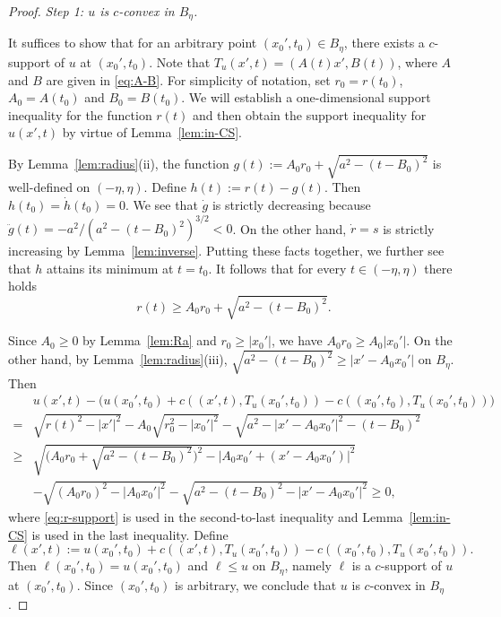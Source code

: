 \documentclass[10pt,a4paper]{amsart}
\begin{document}
\begin{proof}
    {\it Step 1: $u$ is $c$-convex in $B_\eta$.}

    It suffices to show that for an arbitrary point $(x_0',t_0)\in B_\eta$,
    there exists a $c$-support of $u$ at $(x_0',t_0)$.
    Note that $T_u(x',t)=(A(t)x',B(t))$, where $A$ and $B$ are given in \eqref{eq:A-B}.
    For simplicity of notation, set $r_0=r(t_0)$, $A_0=A(t_0)$ and $B_0=B(t_0)$.
    We will establish a one-dimensional support inequality for the function $r(t)$ and then obtain the support inequality for $u(x',t)$ by virtue of Lemma~\ref{lem:in-CS}.

    By Lemma~\ref{lem:radius}(ii), the function $g(t):=A_0r_0+\sqrt{a^2-(t-B_0)^2}$ is well-defined on $(-\eta,\eta)$.
    Define $h(t):=r(t)-g(t)$.
    Then $h(t_0)=\dot{h}(t_0)=0$.
    We see that $\dot{g}$ is strictly decreasing because $\ddot{g}(t)=-a^2/(a^2-(t-B_0)^2)^{3/2}<0$.
    On the other hand, $\dot{r}=s$ is strictly increasing by Lemma~\ref{lem:inverse}.
    Putting these facts together, we further see that $h$ attains its minimum at $t=t_0$.
    It follows that for every $t\in(-\eta,\eta)$ there holds
    \begin{equation}\label{eq:r-support}
        r(t)\geq A_0r_0+\sqrt{a^2-(t-B_0)^2}.
    \end{equation}

    Since $A_0\geq0$ by Lemma~\ref{lem:Ra} and $r_0\geq|x_0'|$, we have $A_0r_0\geq A_0|x_0'|$.
    On the other hand, by Lemma~\ref{lem:radius}(iii), $\sqrt{a^2-(t-B_0)^2}\geq|x'-A_0x_0'|$ on $B_\eta$.
    Then
    \begin{align*}
       &u(x',t)-\Big(u(x_0',t_0)+c((x',t),T_u(x_0',t_0))-c((x_0',t_0),T_u(x_0',t_0))\Big)\\
       =&\sqrt{r(t)^2-|x'|^2}-A_0\sqrt{r_0^2-|x_0'|^2}-\sqrt{a^2-|x'-A_0x_0'|^2-(t-B_0)^2}\\
       \geq&\sqrt{\Big(A_0r_0+\sqrt{a^2-(t-B_0)^2}\Big)^2-|A_0x_0'+(x'-A_0x_0')|^2}\\
       &-\sqrt{(A_0r_0)^2-|A_0x_0'|^2}-\sqrt{a^2-(t-B_0)^2-|x'-A_0x_0'|^2}\geq0,
    \end{align*}
    where \eqref{eq:r-support} is used in the second-to-last inequality and Lemma~\ref{lem:in-CS} is used in the last inequality.
    Define
    \[
    \ell(x',t):=u(x_0',t_0)+c((x',t),T_u(x_0',t_0))-c((x_0',t_0),T_u(x_0',t_0)).
    \]
    Then $\ell(x_0',t_0)=u(x_0',t_0)$ and $\ell\leq u$ on $B_\eta$, namely $\ell$ is a $c$-support of $u$ at $(x_0',t_0)$.
    Since $(x_0',t_0)$ is arbitrary, we conclude that $u$ is $c$-convex in $B_\eta$.


\end{proof}
\end{document}
